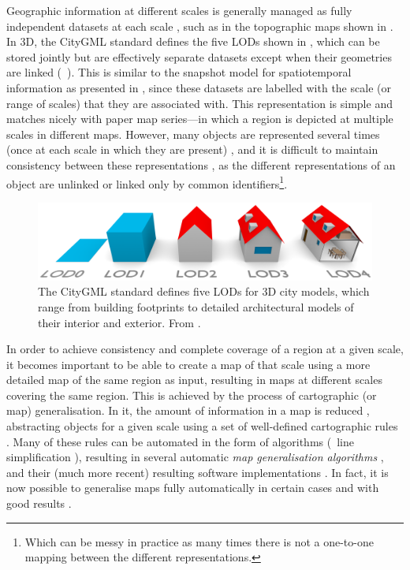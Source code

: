 Geographic information at different scales is generally managed as fully independent datasets at each scale \citep{Meijers11}, such as in the topographic maps shown in .
In 3D, the CityGML standard \citep{CityGML2} defines the five LODs shown in , which can be stored jointly but are effectively separate datasets except when their geometries are linked (\cf\ \citet{Biljecki15}).
This is similar to the snapshot model for spatiotemporal information \citep{Basoglu78,Langran88} as presented in , since these datasets are labelled with the scale (or range of scales) that they are associated with.
This representation is simple and matches nicely with paper map series---in which a region is depicted at multiple scales in different maps.
However, many objects are represented several times (once at each scale in which they are present) \citep{Friis-Christensen03}, and it is difficult to maintain consistency between these representations \citep{Buttenfield89}, as the different representations of an object are unlinked or linked only by common identifiers\footnote{Which can be messy in practice as many times there is not a one-to-one mapping between the different representations.}.

\begin{figure}[tbp]
\centering
\includegraphics[width=\linewidth]{figs/citygml-filip}
\caption[The LODs in CityGML]{The CityGML standard \citep{CityGML2} defines five LODs for 3D city models, which range from building footprints to detailed architectural models of their interior and exterior.
From \citet{Biljecki14a}.}
\label{fig:citygml-filip}
\end{figure}

In order to achieve consistency and complete coverage of a region at a given scale, it becomes important to be able to create a map of that scale using a more detailed map of the same region as input, resulting in maps at different scales covering the same region.
This is achieved by the process of cartographic (or map) generalisation.
In it, the amount of information in a map is reduced \citep{Tofper66}, abstracting objects for a given scale using a set of well-defined cartographic rules \citep{SGK75}.
Many of these rules can be automated in the form of algorithms (\eg\ line simplification \citep{Douglas73}), resulting in several automatic \emph{map generalisation algorithms} \citep{Weibel97}, and their (much more recent) resulting software implementations \citep{Jones05,Stoter09}.
In fact, it is now possible to generalise maps fully automatically in certain cases and with good results \citep{Stoter14}.

